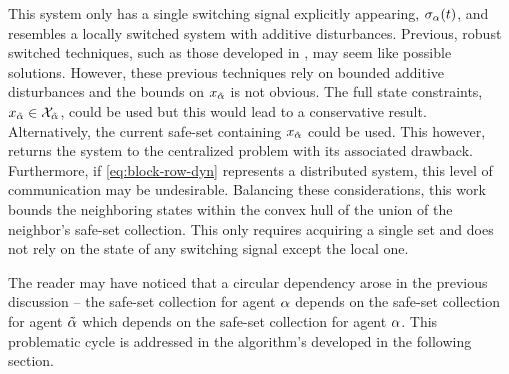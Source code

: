 This system only has a single switching signal explicitly appearing, ${\sigma}_{\alpha}(t)$, and resembles a locally switched system with additive disturbances. Previous, robust switched techniques, such as those developed in \cite{Lavaei2021}, may seem like possible solutions. However, these previous techniques rely on bounded additive disturbances and the bounds on $x_{\tilde{\alpha}}$ is not obvious. The full state constraints, $x_{\tilde{\agentidx}}\in\xcon[\tilde{\agentidx}]$, could be used but this would lead to a conservative result. Alternatively, the current safe-set containing $x_{\tilde{\alpha}}$ could be used. This however, returns the system to the centralized problem with its associated drawback. Furthermore, if \autoref{eq:block-row-dyn} represents a distributed system, this level of communication may be undesirable. Balancing these considerations, this work bounds the neighboring states within the convex hull of the union of the neighbor's safe-set collection. This only requires acquiring a single set and does not rely on the state of any switching signal except the local one. 

The reader may have noticed that a circular dependency arose in the previous discussion -- the safe-set collection for agent $\alpha$ depends on the safe-set collection for agent ${\tilde{\alpha}}$ which depends on the safe-set collection for agent $\alpha$. This problematic cycle is addressed in the algorithm's developed in the following section. 